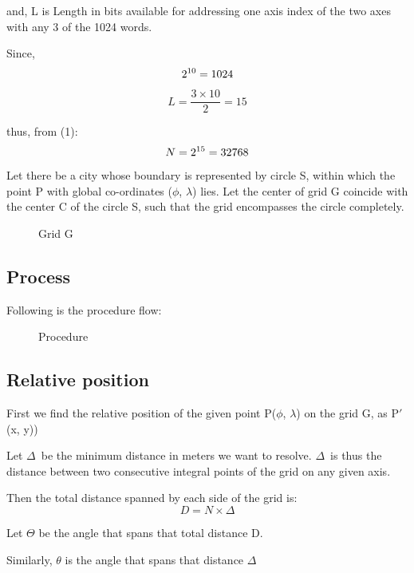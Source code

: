 \documentclass[conference]{IEEEtran}
\begin{document}
and, L is Length in bits available for addressing one axis index of the two axes with any 3 of the 1024 words.

Since, \begin{equation}2\textsuperscript{10}  = 1024\end{equation}

\begin{equation}L = \frac {3 \times 10} {2} = 15 \end{equation}

thus, from (1):
\begin{equation}N = 2\textsuperscript{15} = 32768 \end{equation}

Let there be a city whose boundary is represented by circle S, within which the point P with global co-ordinates ($\phi$, $\lambda$) lies. Let the center of grid G coincide with the center C of the circle S, such that the grid encompasses the circle completely.


\begin{figure}[H]
\centerline{}
\caption{Grid G}
\label{Grid}
\end{figure}

\subsection{Process} Following is the procedure flow:
\begin{figure}[H]
\centerline{}
\caption{Procedure}
\label{Procedure}
\end{figure}

\subsection{Relative position} First we find the relative position of the given point P($\phi$, $\lambda$) on the grid G, as P$'$(x, y))

Let $\Delta$\ be the minimum distance in meters we want to resolve.
$\Delta$\ is thus the distance between two consecutive integral points of the grid on any given axis.

Then the total distance spanned by each side of the grid is:
\begin{equation}D = N \times \Delta\end{equation}

Let $\Theta$ be the angle that spans that total distance D.

Similarly, $\theta$ is the angle that spans that distance $\Delta$
\end{document}
